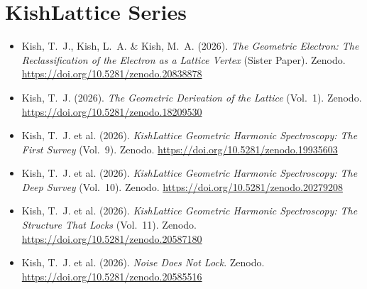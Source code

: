 \documentclass[11pt, letterpaper, openany]{book}
\begin{document}
\section*{KishLattice Series}
\begin{itemize}
	\item Kish, T.~J., Kish, L.~A. \& Kish, M.~A. (2026).
    \textit{The Geometric Electron: The Reclassification of the
    Electron as a Lattice Vertex} (Sister Paper). Zenodo.
    \url{https://doi.org/10.5281/zenodo.20838878}
	
    \item Kish, T.~J. (2026). \textit{The Geometric Derivation of the
    Lattice} (Vol.~1). Zenodo.
    \url{https://doi.org/10.5281/zenodo.18209530}

    \item Kish, T.~J. et al. (2026). \textit{KishLattice Geometric
    Harmonic Spectroscopy: The First Survey} (Vol.~9). Zenodo.
    \url{https://doi.org/10.5281/zenodo.19935603}

    \item Kish, T.~J. et al. (2026). \textit{KishLattice Geometric
    Harmonic Spectroscopy: The Deep Survey} (Vol.~10). Zenodo.
    \url{https://doi.org/10.5281/zenodo.20279208}

    \item Kish, T.~J. et al. (2026). \textit{KishLattice Geometric
    Harmonic Spectroscopy: The Structure That Locks} (Vol.~11). Zenodo.
    \url{https://doi.org/10.5281/zenodo.20587180}

    \item Kish, T.~J. et al. (2026). \textit{Noise Does Not Lock}.
    Zenodo. \url{https://doi.org/10.5281/zenodo.20585516}
\end{itemize}
\end{document}
